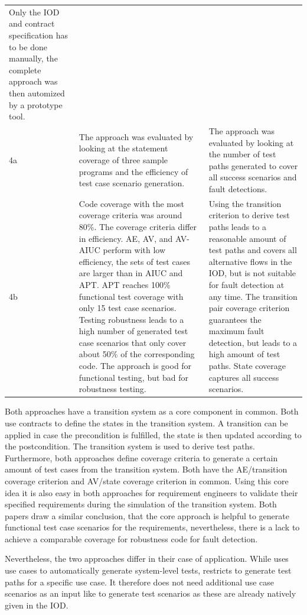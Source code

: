 \begin{longtable}[h]{p{0.5cm}p{}p{}}
	Only the IOD and contract specification has to be done manually, the complete approach was then automized by a prototype tool. \\
	4a & 
	The approach was evaluated by looking at the statement coverage of three sample programs and the efficiency of test case scenario generation. & 
	The approach was evaluated by looking at the number of test paths generated to cover all success scenarios and fault detections. \\
	4b &
	Code coverage with the most coverage criteria was around 80\%. The coverage criteria differ in efficiency. AE, AV, and AV-AIUC perform with low efficiency, the sets of test cases are larger than in AIUC and APT. APT reaches 100\% functional test coverage with only 15 test case scenarios. Testing robustness leads to a high number of generated test case scenarios that only cover about 50\% of the corresponding code. The approach is good for functional testing, but bad for robustness testing. &
	Using the transition criterion to derive test paths leads to a reasonable amount of test paths and covers all alternative flows in the IOD, but is not suitable for fault detection at any time. The transition pair coverage criterion guarantees the maximum fault detection, but leads to a high amount of test paths. State coverage captures all success scenarios. \\
\end{longtable}

Both approaches have a transition system as a core component in common. Both use contracts to define the states in the transition system. A transition can be applied in case the precondition is fulfilled, the state is then updated according to the postcondition. The transition system is used to derive test paths. Furthermore, both approaches define coverage criteria to generate a certain amount of test cases from the transition system. Both have the AE/transition coverage criterion and AV/state coverage criterion in common. Using this core idea it is also easy in both approaches for requirement engineers to validate their specified requirements during the simulation of the transition system. Both papers draw a similar conclusion, that the core approach is helpful to generate functional test case scenarios for the requirements, nevertheless, there is a lack to achieve a comparable coverage for robustness code for fault detection.

Nevertheless, the two approaches differ in their case of application. While \cite{ClementineNebut2006} uses use cases to automatically generate system-level tests, \cite{NajlaRaza2007} restricts to generate test paths for a specific use case. It therefore does not need additional use case scenarios as an input like \cite{ClementineNebut2006} to generate test scenarios as these are already natively given in the IOD. 

